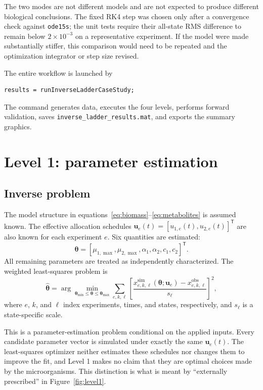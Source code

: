 \documentclass[11pt,a4paper]{article}
\newcommand{\vect}[1]{\boldsymbol{#1}}
\begin{document}
The two modes are not different models and are not expected to produce
different biological conclusions. The fixed RK4 step was chosen only after a
convergence check against \texttt{ode15s}; the unit tests require their
all-state RMS difference to remain below \(2\times10^{-3}\) on a representative
experiment. If the model were made substantially stiffer, this comparison
would need to be repeated and the optimization integrator or step size revised.

The entire workflow is launched by
\begin{lstlisting}[style=matlabstyle]
results = runInverseLadderCaseStudy;
\end{lstlisting}
The command generates data, executes the four levels, performs forward
validation, saves \texttt{inverse\_ladder\_results.mat}, and exports the
summary graphics.

\section{Level 1: parameter estimation}

\subsection{Inverse problem}

The model structure in equations~\eqref{eq:biomass}--\eqref{eq:metabolites}
is assumed known. The effective allocation schedules
\(\vect{u}_e(t)=[u_{1,e}(t),u_{2,e}(t)]^{\mathsf T}\) are also known for each
experiment \(e\). Six quantities are estimated:
\begin{equation}
  \vect{\theta} =
  [\mu_{1,\max},\mu_{2,\max},\alpha_1,\alpha_2,c_1,c_2]^{\mathsf T}.
\end{equation}
All remaining parameters are treated as independently characterized. The
weighted least-squares problem is
\begin{equation}
  \hat{\vect{\theta}} =
  \arg\min_{\vect{\theta}_{\min}\le\vect{\theta}\le\vect{\theta}_{\max}}
  \sum_{e,k,\ell}
  \left[
    \frac{x^{\mathrm{sim}}_{e,k,\ell}(\vect{\theta};\vect{u}_e)
          -x^{\mathrm{obs}}_{e,k,\ell}}
         {s_{\ell}}
  \right]^2,
\end{equation}
where \(e\), \(k\), and \(\ell\) index experiments, times, and states,
respectively, and \(s_{\ell}\) is a state-specific scale.

This is a parameter-estimation problem conditional on the applied inputs.
Every candidate parameter vector is simulated under exactly the same
\(\vect{u}_e(t)\). The least-squares optimizer neither estimates these
schedules nor changes them to improve the fit, and Level 1 makes no claim
that they are optimal choices made by the microorganisms. This distinction
is what is meant by ``externally prescribed'' in Figure~\ref{fig:level1}.
\end{document}
